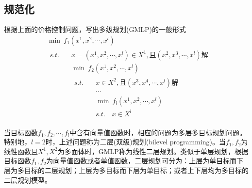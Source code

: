     \subsection{规范化}
        \par
        根据上面的价格控制问题，写出多级规划(GMLP)的一般形式
        \begin{align*}
            &{\min}\ f_1(x^1,x^2,\cdots,x^l)\\
            &\begin{aligned}
            s.t.\quad & x=(x^1,x^2,\cdots,x^l)\in X^1,\text{且}(x^2,x^3,\cdots,x^l)\text{解}\\
            & {\min}\ f_2(x^1,x^2,\cdots,x^l)\\
            &\begin{aligned}
            s.t.\quad & x\in X^2,\text{且}(x^3,x^4,\cdots,x^l)\text{解}\\
           &\cdots \\
           &{\min}\  f_l(x^1,x^2,\cdots,x^l)\\
           &s.t.\quad x \in X^l
           \end{aligned}
            \end{aligned}
        \end{align*}
        \par
        当目标函数$f_1,f_2,\cdots,f_l$中含有向量值函数时，相应的问题为多层多目标规划问题。特别地，$l=2$时，上述问题称为二层(双级)规划(bilevel programming)。当$f_1,f_2$为线性函数且$X^1,X^2$为多面体时，GMLP称为线性二层规划。类似于单层规划，根据目标函数$f_1,f_2$为向量值函数或者单值函数，二层规划可分为：上层为单目标而下层为多目标的二层规划；上层为多目标而下层为单目标；或者上下层均为多目标的二层规划模型。
